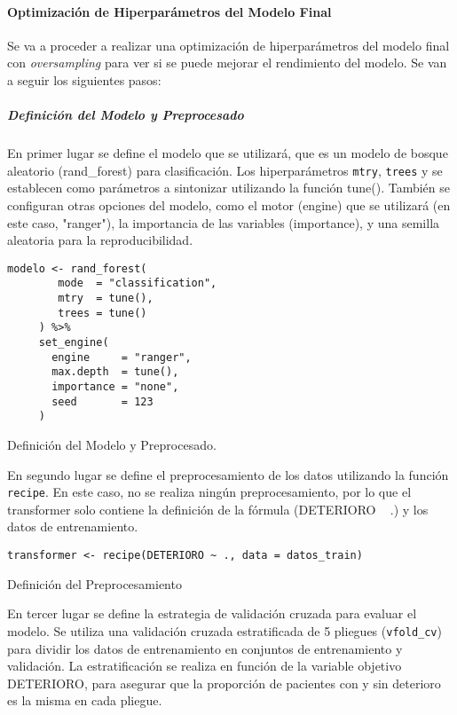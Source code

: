 \paragraph{Optimización de Hiperparámetros del Modelo Final}

Se va a proceder a realizar una optimización de hiperparámetros del modelo final con \textit{oversampling} para ver si se puede mejorar el rendimiento del modelo. Se van a seguir los siguientes pasos:

\subparagraph{Definición del Modelo y Preprocesado}

En primer lugar se define el modelo que se utilizará, que es un modelo de bosque aleatorio (rand\_forest) para clasificación. Los hiperparámetros \texttt{mtry}, \texttt{trees} y  se establecen como parámetros a sintonizar utilizando la función tune(). También se configuran otras opciones del modelo, como el motor (engine) que se utilizará (en este caso, "ranger"), la importancia de las variables (importance), y una semilla aleatoria para la reproducibilidad.

\begin{code}[H]
\begin{lstlisting}[style=mystyle]
    modelo <- rand_forest(
        mode  = "classification",
        mtry  = tune(),
        trees = tune()
     ) %>%
     set_engine(
       engine     = "ranger",
       max.depth  = tune(),
       importance = "none",
       seed       = 123
     )
\end{lstlisting}
\caption{Definición del Modelo y Preprocesado.}
\label{code:Definición del Modelo y Preprocesado}
\end{code}

En segundo lugar se define el preprocesamiento de los datos utilizando la función \texttt{recipe}. En este caso, no se realiza ningún preprocesamiento, por lo que el transformer solo contiene la definición de la fórmula (DETERIORO ~ .) y los datos de entrenamiento.

\begin{code}[H]
\begin{lstlisting}[style=mystyle]
    transformer <- recipe(DETERIORO ~ ., data = datos_train)
\end{lstlisting}
\caption{Definición del Preprocesamiento}
\label{code:Definición del Preprocesamiento}
\end{code}

En tercer lugar se define la estrategia de validación cruzada para evaluar el modelo. Se utiliza una validación cruzada estratificada de 5 pliegues (\texttt{vfold\_cv}) para dividir los datos de entrenamiento en conjuntos de entrenamiento y validación. La estratificación se realiza en función de la variable objetivo DETERIORO, para asegurar que la proporción de pacientes con y sin deterioro es la misma en cada pliegue.

